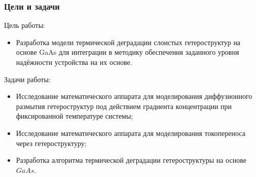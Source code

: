 \documentclass[10pt,pdf,hyperref={unicode},aspectratio={169}]{beamer}
\begin{document}
\begin{frame}
	\frametitle{Цели и задачи}
	\color{blue}
	Цель работы:
	\begin{itemize}
		\item Разработка модели термической деградации слоистых гетероструктур на основе GaAs для интеграции в методику обеспечения заданного уровня надёжности устройства на их основе.
	\end{itemize}
	Задачи работы:
	\begin{itemize}
		\item Исследование математического аппарата для моделирования диффузионного размытия гетероструктур под действием градиента концентрации при фиксированной температуре системы;
		\item Исследование математического аппарата для моделирования токопереноса через гетероструктуру;
		\item Разработка алгоритма термической деградации гетероструктуры на основе $GaAs$.
	\end{itemize}
\end{frame}
\end{document}
